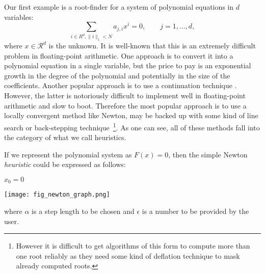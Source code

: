 \documentclass{article}
\begin{document}
Our first example is a root-finder for a system of polynomial equations in $d$ variables:
\[
    \sum_{i \in R^d, \|i\|_1 < N} a_{j,i} x^i = 0, \qquad j = 1, \ldots, d,
\]
where $x\in\mathcal{R}^d$ is the unknown. It is well-known that this is an extremely difficult problem in floating-point arithmetic. One approach is to convert it into a polynomial equation in a single variable, but the price to pay is an exponential growth in the degree of the polynomial and potentially in the size of the coefficients. Another popular approach is to use a continuation technique \cite{allgower2012numerical}. However, the latter is notoriously difficult to implement well in floating-point arithmetic and slow to boot. Therefore the most popular approach is to use a locally convergent method like Newton, may be backed up with some kind of line search or back-stepping technique~\footnote{However it is difficult to get algorithms of this form to compute more than one root reliably as they need some kind of deflation technique to mask already computed roots.}. As one can see, all of these methods fall into the category of what we call heuristics.

If we represent the polynomial system as $F(x)=0$, then the simple Newton \textit{heuristic} could be expressed as follows:

\begin{minipage}[c]{.4\textwidth}
\begin{algorithm}[H]
    $x_0 = 0$ \\
\end{algorithm}
\end{minipage}%
\begin{minipage}[c]{.6\textwidth}
    \centering
    \texttt{[image: fig\_newton\_graph.png]}
     \label{fig:newton_graph}
\end{minipage}


where $\alpha$ is a step length to be chosen and $\epsilon$ is a number to be provided by the user.
\end{document}
